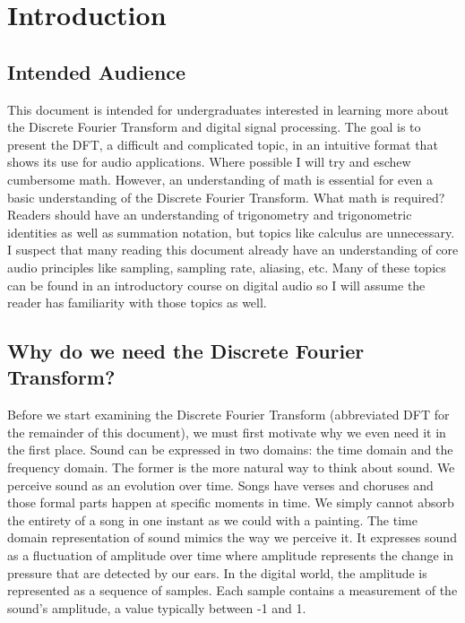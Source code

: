\section*{Introduction}

\subsection*{Intended Audience}

This document is intended for undergraduates interested in learning more about the Discrete Fourier Transform 
and digital signal processing.  The goal is to present the DFT, a difficult and complicated topic, in an 
intuitive format that shows its use for audio applications.  Where possible I will try and eschew 
cumbersome math.  However, an understanding of math is essential for even a basic understanding of
the Discrete Fourier Transform.  What
math is required?   Readers should have an understanding of trigonometry
and trigonometric identities as well as summation notation, but topics like calculus are unnecessary.  I suspect that
many reading this document already have an understanding of core audio principles like sampling, sampling
rate, aliasing, etc.  Many of these topics can be found in an introductory course on digital audio so I will assume
the reader has familiarity with those topics as well.

\subsection*{Why do we need the Discrete Fourier Transform?}

Before we start examining the Discrete Fourier Transform (abbreviated DFT for the remainder
of this document), we must first motivate why we even need it in the first place.  Sound can be expressed
in two domains: the time domain and the frequency domain.  The former is the more natural way to think 
about sound.  We perceive sound as an evolution over time.  Songs have verses and choruses and those
formal parts happen at specific moments in time.  We simply cannot absorb the entirety of a song in one
instant as we could with a painting.  The time domain representation of sound mimics the way we 
perceive it.  It expresses sound as a fluctuation of amplitude over time where amplitude represents
the change in pressure that are detected by our ears.  In the digital world, the amplitude is represented 
as a sequence of samples.  Each sample contains a measurement of the sound's amplitude, a value 
typically between -1 and 1.

